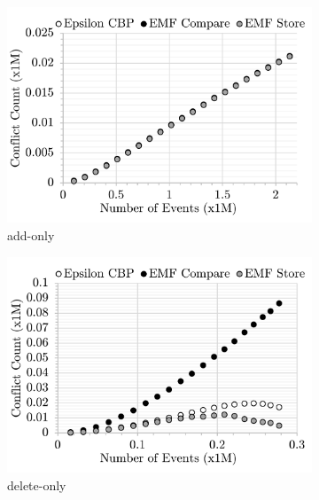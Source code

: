 \begin{figure}[ht]
    \centering
    \begin{subfigure}[t]{0.245\linewidth}
        \includegraphics[width=\linewidth]{add-conflict-count-events}
        \caption{add-only}
        \label{fig:add-conflict-count-events}
    \end{subfigure}
    \hfill
    \begin{subfigure}[t]{0.245\linewidth}
        \includegraphics[width=\linewidth]{delete-conflict-count-events}
        \caption{delete-only}
        \label{fig:delete-conflict-count-events}
    \end{subfigure}
    \hfill
    \begin{subfigure}[t]{0.245\linewidth}

\end{subfigure}
\end{figure}
